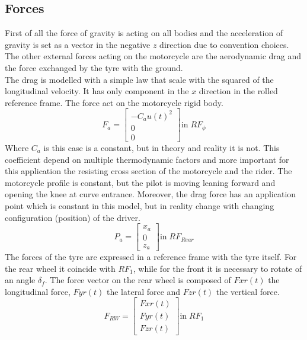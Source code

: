 \subsection{Forces}
%
First of all the force of gravity is acting on all bodies and the acceleration of gravity is set as a vector in the negative $z$ direction due to convention choices.\\
The other external forces acting on the motorcycle are the aerodynamic drag and the force exchanged by the tyre with the ground.\\
The drag is modelled with a simple law that scale with the squared of the longitudinal velocity. It has only component in the $x$ direction in the rolled reference frame. The force act on the motorcycle rigid body.
%
\begin{equation}
    F_a = 
    \left[
    \begin{array}{c}
        -C_a u(t)^2\\
        0\\
        0
    \end{array}
    \right ]
    \text{in} \; RF_\phi
\end{equation}
%
Where $C_a$ is this case is a constant, but in theory and reality it is not. This coefficient depend on multiple thermodynamic factors and more important for this application the resisting cross section of the motorcycle and the rider. The motorcycle profile is constant, but the pilot is moving leaning forward and opening the knee at curve entrance. 
Moreover, the drag force has an application point which is constant in this model, but in reality change with changing configuration (position) of the driver.
%
\begin{equation}
    P_a = 
    \left[
    \begin{array}{c}
        x_a\\
        0\\
        z_a
    \end{array}
    \right ]
    \text{in} \; RF_{Rear}
\end{equation}
%
The forces of the tyre are expressed in a reference frame with the tyre itself. For the rear wheel it coincide with $RF_1$, while for the front it is necessary to rotate of an angle $\delta_f$.
The force vector on the rear wheel is composed of $Fxr(t)$ the longitudinal force, $Fyr(t)$ the lateral force and $Fzr(t)$ the vertical force.
%
\begin{equation}
    F_{RW} = 
    \left[
    \begin{array}{c}
        Fxr(t)\\
        Fyr(t)\\
        Fzr(t)
    \end{array}
    \right ]
    \text{in} \; RF_1
\end{equation}

